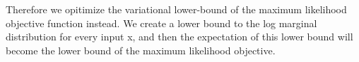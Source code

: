 \documentclass[11pt]{article}
\begin{document}
Therefore we opitimize the variational lower-bound of the maximum likelihood objective function instead. We create a lower bound to the log marginal distribution for every input x, and then the expectation of this lower bound will become the lower bound of the maximum likelihood objective.

\begin{figure}[H]
    \centering
\end{figure}
\end{document}
